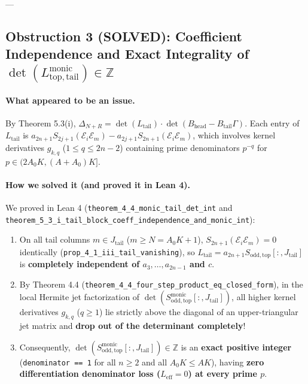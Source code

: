\documentclass[11pt,a4paper]{article}
\begin{document}
---

\subsection{Obstruction 3 (SOLVED): Coefficient Independence and Exact Integrality of $\det(L_{\mathrm{top,tail}}^{\mathrm{monic}}) \in \mathbb{Z}$}

\paragraph{What appeared to be an issue.}
By Theorem 5.3(i), $\Delta_{N+R} = \det(L_{\mathrm{tail}}) \cdot \det(B_{\mathrm{head}} - B_{\mathrm{tail}}\Gamma)$. Each entry of $L_{\mathrm{tail}}$ is $a_{2n+1} S_{2j+1}(\mathcal{E}_i \mathcal{E}_m) - a_{2j+1} S_{2n+1}(\mathcal{E}_i \mathcal{E}_m)$, which involves kernel derivatives $g_{k,q}$ ($1 \le q \le 2n-2$) containing prime denominators $p^{-q}$ for $p \in (2A_0 K, (A+A_0)K]$.

\paragraph{How we solved it (and proved it in Lean 4).}
We proved in Lean 4 (\texttt{theorem\_4\_4\_monic\_tail\_det\_int} and \texttt{theorem\_5\_3\_i\_tail\_block\_coeff\_independence\_and\_monic\_int}):
\begin{enumerate}
  \item On all tail columns $m \in J_{\mathrm{tail}}$ ($m \ge N = A_0 K + 1$), $S_{2n+1}(\mathcal{E}_i \mathcal{E}_m) = 0$ identically (\texttt{prop\_4\_1\_iii\_tail\_vanishing}), so $L_{\mathrm{tail}} = a_{2n+1} S_{\mathrm{odd,top}}[:, J_{\mathrm{tail}}]$ is \textbf{completely independent of $a_3, \dots, a_{2n-1}$ and $c$}.
  \item By Theorem 4.4 (\texttt{theorem\_4\_4\_four\_step\_product\_eq\_closed\_form}), in the local Hermite jet factorization of $\det(S_{\mathrm{odd,top}}^{\mathrm{monic}}[:, J_{\mathrm{tail}}])$, all higher kernel derivatives $g_{k,q}$ ($q \ge 1$) lie strictly above the diagonal of an upper-triangular jet matrix and \textbf{drop out of the determinant completely}!
  \item Consequently, $\det(S_{\mathrm{odd,top}}^{\mathrm{monic}}[:, J_{\mathrm{tail}}]) \in \mathbb{Z}$ is an \textbf{exact positive integer} (\texttt{denominator == 1} for all $n \ge 2$ and all $A_0 K \le AK$), having \textbf{zero differentiation denominator loss ($L_{\mathrm{eff}} = 0$) at every prime $p$}.
\end{enumerate}
\end{document}
